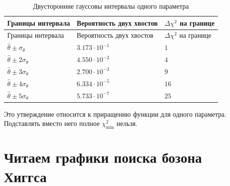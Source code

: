 \documentclass[
  russian,
  11pt,
  a4paper,
  open=any]{scrbook}
\begin{document}
\begin{longtable}[]{@{}
  >{\raggedright\arraybackslash}p{}
  >{\raggedleft\arraybackslash}p{}
  >{\raggedleft\arraybackslash}p{}@{}}
\caption{Двусторонние гауссовы интервалы одного
параметра}\label{tbl-p-to-z-two-sided}\tabularnewline
\toprule\noalign{}
\begin{minipage}[b]{\linewidth}\raggedright
Границы интервала
\end{minipage} & \begin{minipage}[b]{\linewidth}\raggedleft
Вероятность двух хвостов
\end{minipage} & \begin{minipage}[b]{\linewidth}\raggedleft
\(\Delta\chi^2\) на границе
\end{minipage} \\
\midrule\noalign{}
\endfirsthead
\toprule\noalign{}
\begin{minipage}[b]{\linewidth}\raggedright
Границы интервала
\end{minipage} & \begin{minipage}[b]{\linewidth}\raggedleft
Вероятность двух хвостов
\end{minipage} & \begin{minipage}[b]{\linewidth}\raggedleft
\(\Delta\chi^2\) на границе
\end{minipage} \\
\midrule\noalign{}
\endhead
\bottomrule\noalign{}
\endlastfoot
\(\widehat\theta\pm\sigma_\theta\) & \(3.173\cdot10^{-1}\) & \(1\) \\
\(\widehat\theta\pm2\sigma_\theta\) & \(4.550\cdot10^{-2}\) & \(4\) \\
\(\widehat\theta\pm3\sigma_\theta\) & \(2.700\cdot10^{-3}\) & \(9\) \\
\(\widehat\theta\pm4\sigma_\theta\) & \(6.334\cdot10^{-5}\) & \(16\) \\
\(\widehat\theta\pm5\sigma_\theta\) & \(5.733\cdot10^{-7}\) & \(25\) \\
\end{longtable}

Это утверждение относится к приращению функции для одного параметра.
Подставлять вместо него полное \(\chi^2_{\min}\) нельзя.

\section{Читаем графики поиска бозона
Хиггса}\label{ux447ux438ux442ux430ux435ux43c-ux433ux440ux430ux444ux438ux43aux438-ux43fux43eux438ux441ux43aux430-ux431ux43eux437ux43eux43dux430-ux445ux438ux433ux433ux441ux430}
\end{document}
